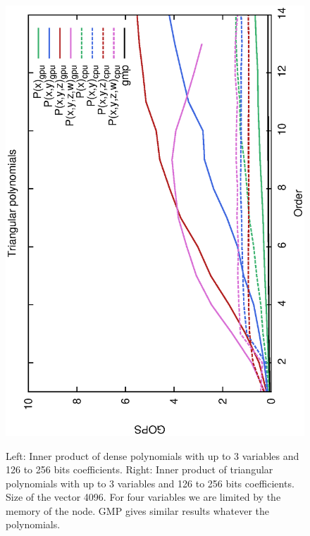 \documentclass[oribibl]{llncs2e/llncs}
\begin{document}
\begin{figure}[t!]
\begin{center}
{\includegraphics[scale=0.37, angle=-90]{MC128.eps} 
}
\caption{Left: Inner product of dense polynomials with up to 3 variables and 126 to 256 bits coefficients. Right: Inner product of triangular polynomials with up to 3 variables and 126 to 256 bits coefficients.  Size of the vector 4096. For four variables we are limited by the memory of the node. GMP gives similar results whatever the polynomials.}
\label{ResME}
\end{center}
\end{figure}
\end{document}
